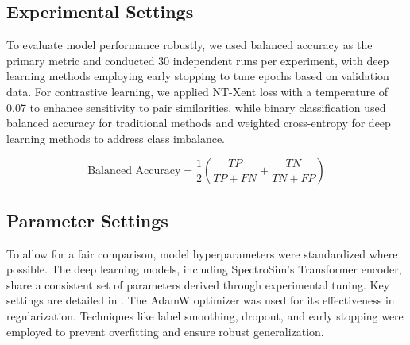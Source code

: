 \subsection{Experimental Settings}

To evaluate model performance robustly, we used balanced accuracy as the primary metric and conducted 30 independent runs per experiment, with deep learning methods employing early stopping \citep{Morgan1989} to tune epochs based on validation data. For contrastive learning, we applied NT-Xent loss with a temperature of 0.07 to enhance sensitivity to pair similarities, while binary classification used balanced accuracy for traditional methods and weighted cross-entropy for deep learning methods to address class imbalance.

\[ \text{Balanced Accuracy} = \frac{1}{2} \left( \frac{TP}{TP + FN} + \frac{TN}{TN + FP} \right) \] 


\subsection{Parameter Settings}


To allow for a fair comparison, model hyperparameters were standardized where possible. The deep learning models, including SpectroSim's Transformer encoder, share a consistent set of parameters derived through experimental tuning. Key settings are detailed in . The AdamW optimizer was used for its effectiveness in regularization. Techniques like label smoothing, dropout, and early stopping were employed to prevent overfitting and ensure robust generalization.

